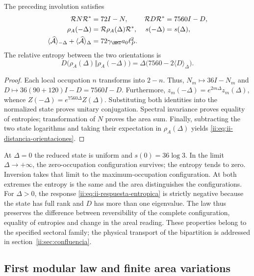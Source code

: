 \begin{theorem}
The preceding involution satisfies
\begin{align}
 \mathcal R N\mathcal R^*&=72I-N,&
 \mathcal R D\mathcal R^*&=7560I-D,\\
 \rho_A(-\Delta)&=\mathcal R\rho_A(\Delta)\mathcal R^*,&
 s(-\Delta)&=s(\Delta),
 \label{ii:eq:ii-inversion-entropia}\\
 \langle\widehat{\mathcal A}\rangle_{-\Delta}
 +\langle\widehat{\mathcal A}\rangle_\Delta
 &=72\gamma_{\HMT}a_0\ell_P^2.&&
 \label{ii:eq:ii-area-complementaria}
\end{align}
The relative entropy between the two orientations is
\begin{equation}
 D\bigl(\rho_A(\Delta)\Vert\rho_A(-\Delta)\bigr)
 =\Delta\bigl(7560-2\langle D\rangle_\Delta\bigr).
 \label{ii:eq:ii-distancia-orientaciones}
\end{equation}
\end{theorem}
\begin{proof}
Each local occupation $n$ transforms into $2-n$. Thus,
$N_m\mapsto36I-N_m$ and
$D\mapsto36(90+120)I-D=7560I-D$.
Furthermore, $z_m(-\Delta)=e^{2m\Delta}z_m(\Delta)$,
whence $Z(-\Delta)=e^{7560\Delta}Z(\Delta)$.
Substituting both identities into the normalized state proves
unitary conjugation. Spectral invariance proves equality
of entropies; transformation of $N$ proves the area sum.
Finally, subtracting the two state logarithms and taking
their expectation in $\rho_A(\Delta)$ yields
\eqref{ii:eq:ii-distancia-orientaciones}.
\end{proof}

At $\Delta=0$ the reduced state is uniform and
$s(0)=36\log3$. In the limit $\Delta\to+\infty$, the zero-occupation
configuration survives; the entropy tends to zero.
Inversion takes that limit to the maximum-occupation configuration.
At both extremes the entropy is the same and the area distinguishes the
configurations. For $\Delta>0$, the response
\eqref{ii:eq:ii-respuesta-entropica} is strictly negative because
the state has full rank and $D$ has more than one eigenvalue.
The law thus preserves the difference between reversibility of the
complete configuration, equality of entropies and change in the areal reading.
These properties belong to the specified sectoral family;
the physical transport of the bipartition is addressed in
section~\ref{ii:sec:confluencia}.

\subsection{First modular law and finite area variations}
\label{ii:sec:ii-area-ley-modular}


